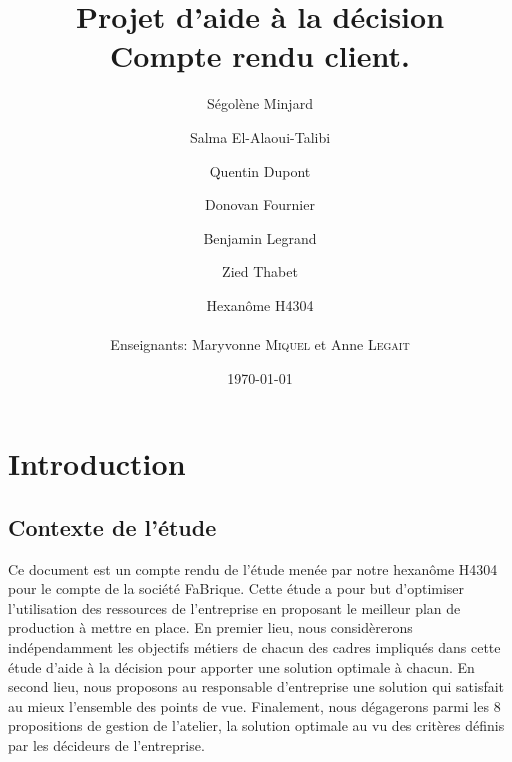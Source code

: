 \documentclass[12pt]{article}
\title{Projet d'aide à la décision \\ Compte rendu client.}
\date{\today}
\author{Ségolène Minjard \and Salma El-Alaoui-Talibi \and Quentin Dupont \and Donovan Fournier \and Benjamin Legrand \and Zied Thabet \and Hexanôme H4304 \\ \\ Enseignants: Maryvonne \textsc{Miquel}
et Anne \textsc{Legait}  }
\begin{document}
\maketitle

\vspace{25pt}
\setcounter{tocdepth}{2}
\tableofcontents %
\pagebreak

\section{Introduction}
\subsection{Contexte de l'étude}
Ce document est un compte rendu de l'étude menée par notre hexanôme H4304 pour le compte de la société FaBrique. Cette étude a pour but d'optimiser l'utilisation des ressources de l'entreprise en proposant le meilleur plan de production à mettre en place. \newline
En premier lieu, nous considèrerons indépendamment les objectifs métiers de chacun des cadres impliqués dans cette étude d'aide à la décision pour apporter une solution optimale à chacun.
En second lieu, nous proposons au responsable d'entreprise une solution qui satisfait au mieux l'ensemble des points de vue.
Finalement, nous dégagerons parmi les 8 propositions de gestion de l'atelier, la solution optimale au vu des critères définis par les décideurs de l'entreprise.    
\end{document}
